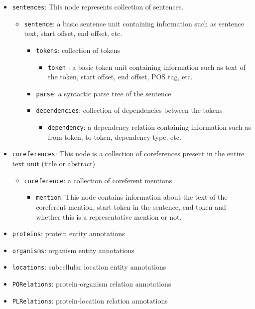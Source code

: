 \begin{enumerate}
\begin{itemize}
\item \texttt{sentences}: This node represents collection of sentences.
  \begin{itemize}
  \item \texttt{sentence}: a basic sentence unit containing information such as sentence text, start offset, end offset, etc.
    \begin{itemize}
	\item \texttt{tokens}: collection of tokens
	  \begin{itemize}	  
	  \item \texttt{token}	: a basic token unit containing information such as text of the token, start offset, end offset, POS tag, etc.		
	  \end{itemize}
	\item \texttt{parse}: a syntactic parse tree of the sentence
	\item \texttt{dependencies}: collection of dependencies between the tokens	  
	  \begin{itemize}
	  \item \texttt{dependency}: a dependency relation containing information such as from token, to token, dependency type, etc.
	  \end{itemize}	  
	\end{itemize}	
  \end{itemize}
  \item \texttt{coreferences}:
    This node is a collection of coreferences present in the entire text unit (title or abstract)
    \begin{itemize}
    \item \texttt{coreference}: a collection of coreferent mentions
    \begin{itemize}
      \item \texttt{mention}: This node contains information about the text of the coreferent mention, start token in the sentence, end token and whether this is a representative mention or not.
    \end{itemize}
    \end{itemize}

\item \texttt{proteins}: protein entity annotations
\item \texttt{organisms}: organism entity annotations
\item \texttt{locations}: subcellular location entity annotations
\item \texttt{PORelations}: protein-organism relation annotations
\item \texttt{PLRelations}: protein-location relation annotations
\end{itemize}


\end{enumerate}
